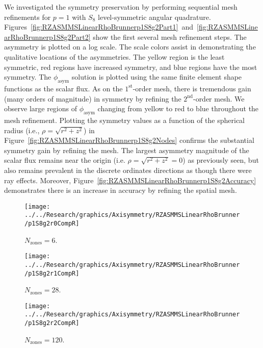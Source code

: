 \documentclass[12pt,letterpaper]{article}
\begin{document}
\FloatBarrier

We investigated the symmetry preservation by performing sequential mesh refinements for $p=1$ with $S_8$ level-symmetric angular quadrature. Figures~\ref{fig:RZASMMSLinearRhoBrunnerp1S8g2Part1}~and~\ref{fig:RZASMMSLinearRhoBrunnerp1S8g2Part2} show the first several mesh refinement steps. The asymmetry is plotted on a log scale. The scale colors assist in demonstrating the qualitative locations of the asymmetries. The yellow region is the least symmetric, red regions have increased symmetry, and blue regions have the most symmetry. The $\phi_\text{asym}$ solution is plotted using the same finite element shape functions as the scalar flux. As on the $1^\text{st}$-order mesh, there is tremendous gain (many orders of magnitude) in symmetry by refining the $2^\text{nd}$-order mesh. We observe large regions of $\phi_\text{asym}$ changing from yellow to red to blue throughout the mesh refinement. Plotting the symmetry values as a function of the spherical radius (i.e., $\rho=\sqrt{r^2+z^2}$) in Figure~\ref{fig:RZASMMSLinearRhoBrunnerp1S8g2Nodes} confirms the substantial symmetry gain by refining the mesh. The largest asymmetry magnitude of the scalar flux remains near the origin (i.e. $\rho=\sqrt{r^2+z^2}=0$) as previously seen, but also remains prevalent in the discrete ordinates directions as though there were ray effects. Moreover, Figure~\ref{fig:RZASMMSLinearRhoBrunnerp1S8g2Accuracy} demonstrates there is an increase in accuracy by refining the spatial mesh.

\begin{sidewaysfigure}[!htb]
\centering
\begin{subfigure}{0.33\textwidth}
\texttt{[image: ../../Research/graphics/Axisymmetry/RZASMMSLinearRhoBrunner/p1S8g2r0CompR]}
\caption{$N_\text{zones}=6$.}
\end{subfigure}%
\begin{subfigure}{0.33\textwidth}
\texttt{[image: ../../Research/graphics/Axisymmetry/RZASMMSLinearRhoBrunner/p1S8g2r1CompR]}
\caption{$N_\text{zones}=28$.}
\end{subfigure}%
\begin{subfigure}{0.33\textwidth}
\texttt{[image: ../../Research/graphics/Axisymmetry/RZASMMSLinearRhoBrunner/p1S8g2r2CompR]}
\caption{$N_\text{zones}=120$.}
\end{subfigure}
\caption{Relative asymmetry for $p=1$ finite elements on a $2^\text{nd}$-order mesh for $S_8$ level-symmetric angular quadrature.}
\label{fig:RZASMMSLinearRhoBrunnerp1S8g2Part1}
\end{sidewaysfigure}
\end{document}
